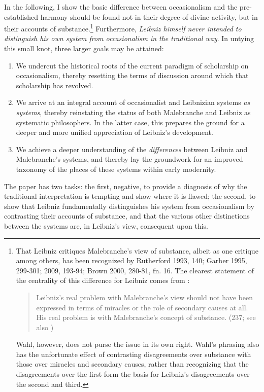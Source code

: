\documentclass{article}
\begin{document}
In the following, I show the basic difference between occasionalism and
the pre-established harmony should be found not in their degree of
divine activity, but in their accounts of substance.\footnote{That
  Leibniz critiques Malebranche's view of substance, albeit as one
  critique among others, has been recognized by Rutherford 1993, 140;
  Garber 1995, 299-301; 2009, 193-94; Brown 2000, 280-81, fn. 16. The
  clearest statement of the centrality of this difference for Leibniz
  comes from \autocite{Wahl2011}:

  \begin{quote}
  Leibniz's real problem with Malebranche's view should not have been
  expressed in terms of miracles or the role of secondary causes at all.
  His real problem is with Malebranche's concept of substance. (237; see
  also \autocite{Whipple2010})
  \end{quote}

  Wahl, however, does not purse the issue in its own right. Wahl's
  phrasing also has the unfortunate effect of contrasting disagreements
  over substance with those over miracles and secondary causes, rather
  than recognizing that the disagreements over the first form the basis
  for Leibniz's disagreements over the second and third.} Furthermore,
\emph{Leibniz himself never intended to distinguish his own system from
occasionalism in the traditional way}. In untying this small knot, three
larger goals may be attained:

\begin{enumerate}
\item We undercut the historical roots of the current paradigm of
  scholarship on occasionalism, thereby resetting the terms of
  discussion around which that scholarship has revolved.
\item We arrive at an integral account of occasionalist and Leibnizian
  systems \emph{as systems}, thereby reinstating the status of both
  Malebranche and Leibniz as systematic philosophers. In the latter
  case, this prepares the ground for a deeper and more unified
  appreciation of Leibniz's development.
\item We achieve a deeper understanding of the \emph{differences} between
  Leibniz and Malebranche's systems, and thereby lay the groundwork for
  an improved taxonomy of the places of these systems within early
  modernity.
\end{enumerate}

The paper has two tasks: the first, negative, to provide a diagnosis of
why the traditional interpretation is tempting and show where it is
flawed; the second, to show that Leibniz fundamentally distinguishes his
system from occasionalism by contrasting their accounts of substance,
and that the various other distinctions between the systems are, in
Leibniz's view, consequent upon this.
\end{document}
